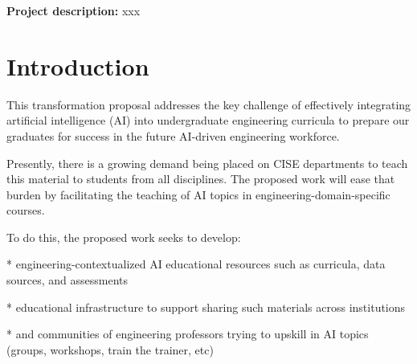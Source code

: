 \documentclass[11pt]{article}
\begin{document}
%
%
\pagestyle{plain} %
%
%
\setlength{\baselineskip}{12.6pt} %
\setlength{\normalbaselineskip}{12.6pt} %


\begin{tcolorbox}[colback=mycmykcolor, colframe=black, boxrule=1pt, coltext=black]
\textbf{Project description:} 
xxx
\end{tcolorbox}


\section{Introduction}

This transformation proposal addresses the key challenge of effectively integrating artificial intelligence (AI) into undergraduate engineering curricula to prepare our graduates for success in the future AI-driven engineering workforce.

Presently, there is a growing demand being placed on CISE departments to teach this material to students from all disciplines. 
The proposed work will ease that burden by facilitating the teaching of AI topics in engineering-domain-specific courses. 

To do this, the proposed work seeks to develop: 

* engineering-contextualized AI educational resources such as curricula, data sources, and assessments

* educational infrastructure to support sharing such materials across institutions

* and communities of engineering professors trying to upskill in AI topics (groups, workshops, train the trainer, etc)
\end{document}
